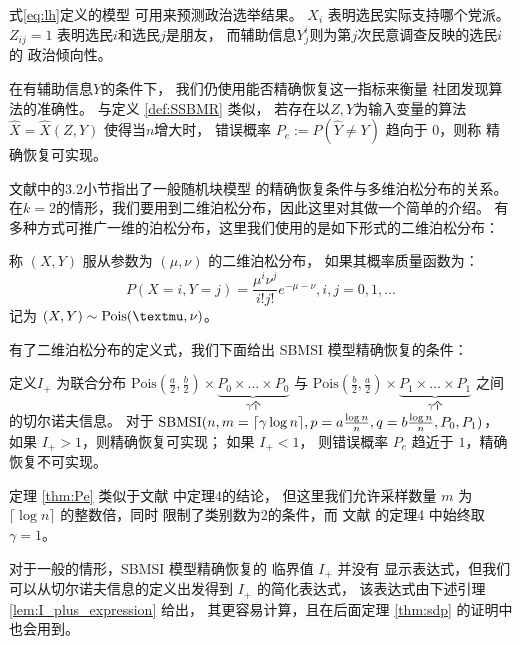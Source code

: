  式\eqref{eq:lh}定义的模型
 可用来预测政治选举结果。
 $X_i$ 表明选民实际支持哪个党派。
 $Z_{ij}=1$
 表明选民$i$和选民$j$是朋友，
 而辅助信息$Y_j^i$则为第$j$次民意调查反映的选民$i$的
 政治倾向性。


 在有辅助信息$Y$的条件下，
 我们仍使用能否精确恢复这一指标来衡量
 社团发现算法的准确性。
 与定义 \ref{def:SSBMR} 类似，
 若存在以$Z,Y$为输入变量的算法 $\hat{X}=\hat{X}(Z,Y)$
 使得当$n$增大时，
 错误概率
 $P_e:=P(\hat{Y} \neq Y)$ 趋向于 $0$，则称
 精确恢复可实现。

 文献中的3.2小节指出了一般随机块模型
 的精确恢复条件与多维泊松分布的关系。
在$k=2$的情形，我们要用到二维泊松分布，因此这里对其做一个简单的介绍。
有多种方式可推广一维的泊松分布，这里我们使用的是如下形式的二维泊松分布：

\begin{definition}
    称 $(X,Y)$ 服从参数为 $(\mu, \nu)$ 的二维泊松分布，
    如果其概率质量函数为：
    \begin{equation}
        P(X=i, Y=j) = \frac{\mu^i \nu^j}{i! j!}
        e^{- \mu - \nu}, i,j=0,1,\dots
    \end{equation}
    记为 $(X,Y) \sim \Pois(\mu, \nu)$。
\end{definition}

有了二维泊松分布的定义式，我们下面给出
SBMSI 模型精确恢复的条件：
\begin{theorem}\label{thm:Pe}
    定义$I_+$ 为联合分布 $\textrm{Pois}(\frac{a}{2},\frac{b}{2})\times \underbrace{P_0 \times \dots \times P_0}_{\gamma \textrm{个}}$
    与 $\textrm{Pois}(\frac{b}{2}, \frac{a}{2})\times \underbrace{P_1 \times \dots \times P_1}_{\gamma \textrm{个}}$ 
    之间的切尔诺夫信息。    
    对于 $\operatorname{SBMSI}(n,m=\lceil \gamma \log n \rceil, p=a\frac{\log n}{n},q=b\frac{\log n}{n},P_0,P_1)$，
    如果 $I_+>1$，则精确恢复可实现；
    如果 $I_+ < 1$，
    则错误概率 $P_e$ 趋近于 $1$，精确恢复不可实现。
\end{theorem}

定理 \ref{thm:Pe} 类似于文献  中定理4的结论，
但这里我们允许采样数量 $m$ 为
$\lceil \log n \rceil $ 的整数倍，同时
限制了类别数为2的条件，而 文献  的定理4
中始终取$\gamma=1$。

对于一般的情形，SBMSI 模型精确恢复的 临界值 $I_+$ 并没有
显示表达式，但我们可以从切尔诺夫信息的定义出发得到 $I_+$ 的简化表达式，
该表达式由下述引理 \ref{lem:I_plus_expression} 给出，
其更容易计算，且在后面定理 \ref{thm:sdp} 的证明中也会用到。

